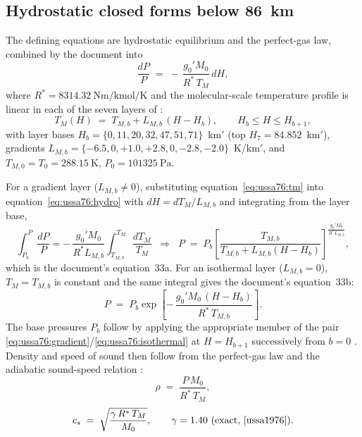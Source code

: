 \subsection{Hydrostatic closed forms below \texorpdfstring{\qty{86}{\kilo\metre}}{86 km}}

The defining equations are hydrostatic equilibrium and the perfect-gas law,
combined by the document into
\begin{equation}
  \frac{dP}{P} \;=\; -\,\frac{g_0' M_0}{R^{*}\,T_M}\,dH,
  \label{eq:ussa76:hydro}
\end{equation}
where $R^{*} = \qty{8314.32}{\newton\metre\per\kilo\mole\per\kelvin}$ and
the molecular-scale temperature profile is linear in each of the seven
layers of \cite[Part~1, Table~4]{ussa1976}:
\begin{equation}
  T_M(H) \;=\; T_{M,b} + L_{M,b}\,(H - H_b),
  \qquad H_b \le H \le H_{b+1},
  \label{eq:ussa76:tm}
\end{equation}
with layer bases $H_b = \{0, 11, 20, 32, 47, 51, 71\}$~km$'$ (top
$H_7 = 84.852$~km$'$), gradients
$L_{M,b} = \{-6.5, 0, +1.0, +2.8, 0, -2.8, -2.0\}$~K/km$'$, and
$T_{M,0} = T_0 = \qty{288.15}{\kelvin}$,
$P_0 = \qty{101325}{\pascal}$.

For a gradient layer ($L_{M,b} \neq 0$), substituting
equation~\eqref{eq:ussa76:tm} into equation~\eqref{eq:ussa76:hydro} with
$dH = dT_M/L_{M,b}$ and integrating from the layer base,
\begin{equation}
  \int_{P_b}^{P} \frac{dP}{P}
   = -\,\frac{g_0' M_0}{R^{*} L_{M,b}}
     \int_{T_{M,b}}^{T_M} \frac{dT_M}{T_M}
  \;\;\Longrightarrow\;\;
  P \;=\; P_b \left[\frac{T_{M,b}}{T_{M,b} + L_{M,b}(H - H_b)}\right]
          ^{\textstyle\frac{g_0' M_0}{R^{*} L_{M,b}}},
  \label{eq:ussa76:gradient}
\end{equation}
which is the document's equation~33a. For an isothermal layer
($L_{M,b} = 0$), $T_M = T_{M,b}$ is constant and the same integral gives
the document's equation~33b:
\begin{equation}
  P \;=\; P_b \exp\!\left[-\,\frac{g_0' M_0\,(H - H_b)}{R^{*}\,T_{M,b}}
          \right].
  \label{eq:ussa76:isothermal}
\end{equation}
The base pressures $P_b$ follow by applying the appropriate member of the
pair \eqref{eq:ussa76:gradient}/\eqref{eq:ussa76:isothermal} at
$H = H_{b+1}$ successively from $b = 0$
\cite[Part~1, \S1.3.1]{ussa1976}. Density and speed of sound then follow
from the perfect-gas law and the adiabatic sound-speed relation
\cite[Part~1, eqs.~42 and~50]{ussa1976}:
\begin{equation}
  \rho \;=\; \frac{P\,M_0}{R^{*}\,T_M},
  \label{eq:ussa76:density}
\end{equation}
\begin{equation}
  c_s \;=\; \sqrt{\frac{\gamma\,R^{*}\,T_M}{M_0}},
  \qquad \gamma = 1.40 \text{ (exact, \cite[Table~2]{ussa1976})}.
  \label{eq:ussa76:speedofsound}
\end{equation}

